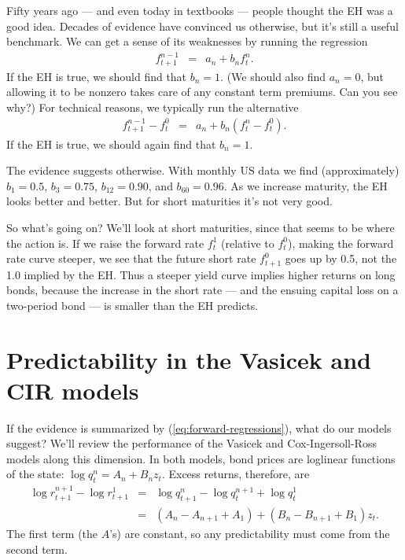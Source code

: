 \documentclass[11pt]{article}
\begin{document}
Fifty years ago --- and even today in textbooks --- people thought the EH was a good idea.
Decades of evidence have convinced us otherwise, but it's still a useful benchmark.
We can get a sense of its weaknesses by running the regression
\begin{eqnarray*}
    f^{n-1}_{t+1} &=& a_n + b_n f^n_t .
\end{eqnarray*}
If the EH is true, we should find that $b_n = 1$.
(We should also find $a_n=0$, but allowing it to be nonzero
takes care of any constant term premiums.
Can you see why?)
For technical reasons, we typically run the alternative
\begin{eqnarray}
    f^{n-1}_{t+1} - f^0_t &=& a_n + b_n (f^n_t - f^0_t) .
    \label{eq:forward-regressions}
\end{eqnarray}
If the EH is true, we should again find that $b_n = 1$.

The evidence suggests otherwise.
With monthly US data we find (approximately) $b_1 = 0.5$, $b_3 = 0.75$,
$b_{12} = 0.90$, and $b_{60} = 0.96$.
As we increase maturity, the EH looks better and better.
But for short maturities it's not very good.

So what's going on?
We'll look at short maturities, since that seems to be where the action is.
If we raise the forward rate $f^1_t$ (relative to $f^0_t$),
making the forward rate curve steeper,
we see that the future short rate $f^0_{t+1}$ goes up by 0.5,
not the 1.0 implied by the EH.
Thus a steeper yield curve implies higher returns on long bonds, because the
increase in the short rate --- and the ensuing capital loss on a two-period bond ---
is smaller than the EH predicts.



\section{Predictability in the Vasicek and CIR models}

If the evidence is summarized by (\ref{eq:forward-regressions}),
what do our models suggest?
We'll review the performance of the Vasicek and Cox-Ingersoll-Ross models
along this dimension.
In both models, bond prices are loglinear functions of the state:
$ \log q^n_t = A_n + B_n z_t$.
Excess returns, therefore, are 
\begin{eqnarray*}
    \log r^{n+1}_{t+1} - \log r^{1}_{t+1} &=& \log q^n_{t+1} - \log q^{n+1}_t + \log q^1_t \\ 
            &=&  (A_n - A_{n+1}+A_1) + (B_n - B_{n+1} + B_1) z_t  .
\end{eqnarray*} 
The first term (the $A$'s) are constant, 
so any predictability must come from the second term.  
\end{document}
